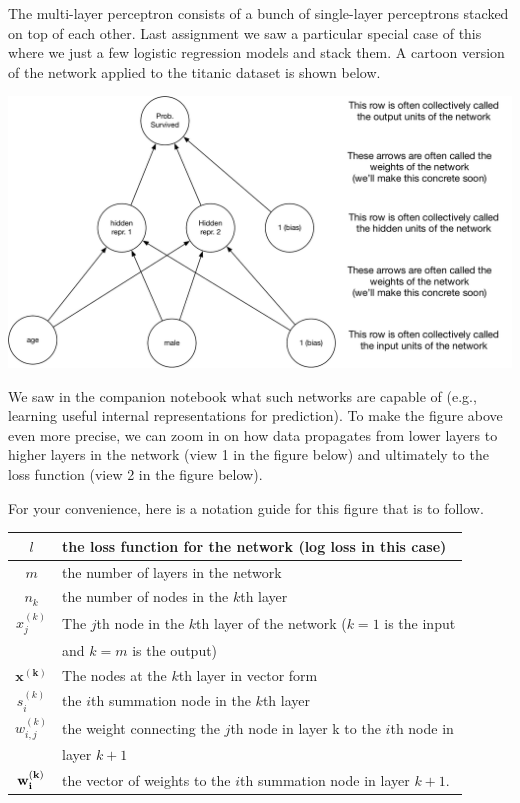\documentclass[assignment07_Solutions]{subfiles}
\begin{document}
\begin{recall}
The multi-layer perceptron consists of a bunch of single-layer perceptrons stacked on top of each other.  Last assignment we saw a particular special case of this where we just a few logistic regression models and stack them.  A cartoon version of the network applied to the titanic dataset is shown below.

\begin{center}
\includegraphics[width=0.7\linewidth]{figures/titanicmlpsimple}
\end{center}

We saw in the companion notebook what such networks are capable of (e.g., learning useful internal representations for prediction).  To make the figure above even more precise, we can zoom in on how data propagates from lower layers to higher layers in the network (view 1 in the figure below) and ultimately to the loss function (view 2 in the figure below).

\vspace{1em}

For your convenience, here is a notation guide for this figure that is to follow.
\vspace{1em}

\begin{tabular}{| c | l |}
\hline
$l$ & the loss function for the network (log loss in this case) \\
\hline
$m$ & the number of layers in the network \\
\hline
$n_{k}$ & the number of nodes in the $k$th layer \\
\hline
$x_j^{(k)}$& The $j$th node in the $k$th layer of the network ($k = 1$ is the input \\
&and $k = m$ is the output) \\
\hline
$\mathbf{x^{(k)}}$ & The nodes at the $k$th layer in vector form \\
\hline
$s_{i}^{(k)}$ & the $i$th summation node in the $k$th layer \\
\hline
$w_{i,j}^{(k)}$ & the weight connecting the $j$th node in layer k to the $i$th node in\\
&  layer $k+1$ \\
\hline
$\mathbf{w_{i}^{(k)}}$ & the vector of weights to the $i$th summation node in layer $k+1$.\\
\hline
\end{tabular}


\end{recall}
\end{document}
